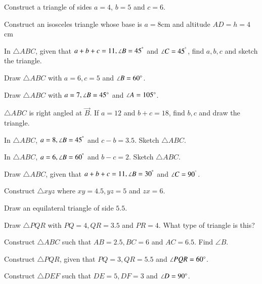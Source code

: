 


\item Construct a triangle of sides $a=4$, $b=5$  and $c=6$.  
\item Construct an isosceles triangle whose base is $a=8$cm and altitude $AD=h=4$cm 
\item In $\triangle ABC$,  given that $a+b+c = 11, \angle B = 45^{\degree}$ and $\angle C = 45^{\degree}$, 
find 
$a,b,c$ and sketch the triangle.
\item Draw $\triangle ABC$ with $a = 6, c = 5$ and $\angle B = 60 \degree$. 
\item Draw $\triangle ABC$ with $a = 7, \angle B = 45\degree$ and $\angle A = 105 \degree$. 
\item $\triangle ABC$ is right angled at $\vec{B}$.  If $a = 12$ and $b+c = 18$, find $b,c$ and draw the triangle.
\item In $\triangle ABC$,  $a = 8, \angle B = 45^{\degree}$ and $c-b = 3.5$.
Sketch $\triangle ABC$.
\\
\solution
%

\item In $\triangle ABC$,  $a = 6, \angle B = 60^{\degree}$ and $b-c = 2$. 
Sketch $\triangle ABC$.
\item Draw $\triangle ABC$,  given that $a+b+c = 11, \angle B = 30^{\degree}$ and $\angle C = 90^{\degree}$.
\item Construct $\triangle xyz$ where $xy = 4.5, yz = 5$ and $zx = 6$.
\item Draw an equilateral triangle of side $5.5$.
\item Draw $\triangle PQR$ with $PQ = 4, QR = 3.5$ and $PR = 4$.  What type of triangle is this?
\item Construct $\triangle ABC$ such that $AB = 2.5, BC = 6$ and $AC = 6.5$.  Find $\angle B$.
\item Construct $\triangle PQR$, given that $PQ = 3, QR = 5.5$ and $\angle PQR = 60 \degree$.
\item Construct $\triangle DEF$ such that $DE = 5, DF = 3$ and $\angle D = 90\degree$.
\\
\solution


